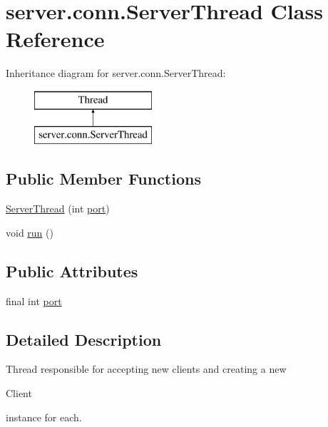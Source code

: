 \hypertarget{classserver_1_1conn_1_1_server_thread}{}\section{server.\+conn.\+Server\+Thread Class Reference}
\label{classserver_1_1conn_1_1_server_thread}
Inheritance diagram for server.\+conn.\+Server\+Thread\+:\begin{figure}[H]
\begin{center}
\leavevmode
\includegraphics[height=2.000000cm]{classserver_1_1conn_1_1_server_thread}
\end{center}
\end{figure}
\subsection*{Public Member Functions}
\begin{DoxyCompactItemize}
\item 
\hyperlink{classserver_1_1conn_1_1_server_thread_af828429a6a24354091d0c72a611d8886}{Server\+Thread} (int \hyperlink{classserver_1_1conn_1_1_server_thread_aa8378d032cb5eaaf76feec72be077b4d}{port})
\item 
void \hyperlink{classserver_1_1conn_1_1_server_thread_a1138f0c399d99cf4c00277ad1e7b2984}{run} ()
\end{DoxyCompactItemize}
\subsection*{Public Attributes}
\begin{DoxyCompactItemize}
\item 
final int \hyperlink{classserver_1_1conn_1_1_server_thread_aa8378d032cb5eaaf76feec72be077b4d}{port}
\end{DoxyCompactItemize}


\subsection{Detailed Description}
Thread responsible for accepting new clients and creating a new 
\begin{DoxyCode}
Client 
\end{DoxyCode}
 instance for each.

